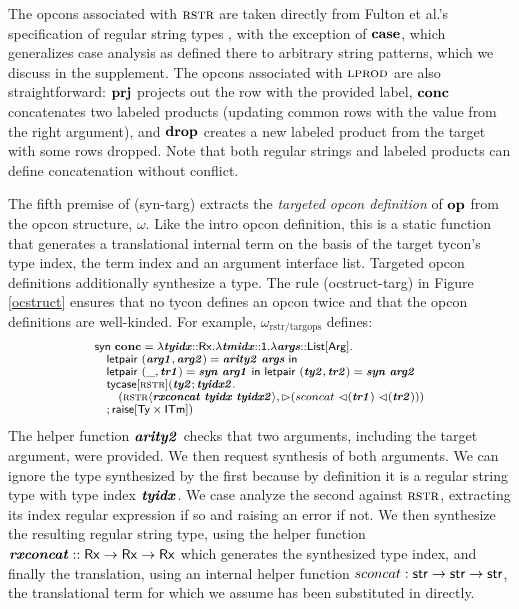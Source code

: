 \documentclass[10pt,preprint]{sigplanconf}
\begin{document}
The opcons associated with $\textsc{rstr}$ are taken directly from Fulton et al.'s specification of regular string types \cite{sanitation-psp14}, with the exception of $\textbf{case}$, which generalizes case analysis as defined there to arbitrary string patterns, which we discuss in the supplement. The opcons associated with $\textsc{lprod}$ are also straightforward: $\textbf{prj}$ projects out the row with the provided label, $\textbf{conc}$ concatenates two labeled products (updating common rows with the value from the right argument), and $\textbf{drop}$ creates a new labeled product from the target with some rows dropped. Note that both regular strings and labeled products can define concatenation without conflict. %

The fifth premise of (syn-targ) extracts the \emph{targeted opcon definition} of $\textbf{op}$ from the opcon structure, $\omega$. Like the intro opcon definition, this is a static function that generates a translational internal term on the basis of the target tycon's type index, the term index and an argument interface list. Targeted opcon definitions additionally synthesize a type. The rule (ocstruct-targ) in Figure \ref{ocstruct} ensures that no tycon defines an opcon twice and that the opcon definitions are well-kinded. 
For example, $\omega_\text{rstr/targops}$ defines:
\[\small
\begin{array}{l}
\keyw{syn}~\opname{conc}=\slam{\krx}{\svar{tyidx}}{
    \slam{\kunit}{\svar{tmidx}}{
        \slam{\kargs}{\svar{args}}{\\
            \quad \keyw{letpair}~(\svar{arg1}, \svar{arg2}) = \svar{arity2}~\svar{args}~\keyw{in}\\
            \quad \keyw{letpair}~(\_, \svar{tr1}) = \svar{syn}~\svar{arg1}~\keyw{in}~ \keyw{letpair}~(\svar{ty2}, \svar{tr2}) = \svar{syn}~\svar{arg2}\\
            \quad \stycase{\tcvar{rstr}}{\svar{ty2}}{\svar{tyidx2}}{\\
                \quad\quad (\sty{\tcvar{rstr}}{\svar{rxconcat}~\svar{tyidx}~\svar{tyidx2}}, \sqitm{sconcat~\quq{\svar{tr1}}~\quq{\svar{tr2}}})\\
                \quad
            }{\sraise{\kty\times\kitm}}
        }
    }
}
\end{array}
\]
The helper function ${\textbf{\textit{arity2}}}$ checks that two arguments, including the target argument, were provided. We then request synthesis of both arguments. We can ignore the type synthesized by the first because by definition it is a regular string type with type index ${\textbf{\textit{tyidx}}}$. We case analyze the second against $\textsc{rstr}$, extracting its index regular expression if so and raising an error if not. We then synthesize the resulting regular string type, using the helper function ${\textbf{\textit{rxconcat}}} :: {\sf Rx} \rightarrow {\sf Rx} \rightarrow {\sf Rx}$ which generates the synthesized type index, and finally the translation, using an internal helper function $sconcat : {\sf str} \rightarrow {\sf str} \rightarrow {\sf str}$, the translational term for which we assume has been substituted in directly.
\end{document}
